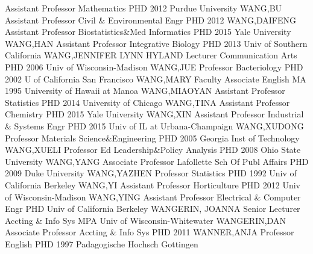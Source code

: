 \documentclass[
]{article}
\begin{document}
\textbar Assistant Professor \textbar Mathematics \textbar PHD 2012
Purdue University \textbar{}  \textbar WANG,BU
\textbar Assistant Professor \textbar Civil \& Environmental Engr
\textbar PHD 2012 \textbar{}  \textbar WANG,DAIFENG
\textbar Assistant Professor \textbar Biostatistics\&Med Informatics
\textbar PHD 2015 Yale University \textbar{} 
\textbar WANG,HAN \textbar Assistant Professor \textbar Integrative
Biology \textbar PHD 2013 Univ of Southern California \textbar{}
 \textbar WANG,JENNIFER LYNN HYLAND \textbar Lecturer
\textbar Communication Arts \textbar PHD 2006 Univ of Wisconsin-Madison
\textbar{}  \textbar WANG,JUE \textbar Professor
\textbar Bacteriology \textbar PHD 2002 U of California San Francisco
\textbar{}  \textbar WANG,MARY \textbar Faculty Associate
\textbar English \textbar MA 1995 University of Hawaii at Manoa
\textbar{}  \textbar WANG,MIAOYAN \textbar Assistant
Professor \textbar Statistics \textbar PHD 2014 University of Chicago
\textbar{}  \textbar WANG,TINA \textbar Assistant Professor
\textbar Chemistry \textbar PHD 2015 Yale University \textbar{}
 \textbar WANG,XIN \textbar Assistant Professor
\textbar Industrial \& Systems Engr \textbar PHD 2015 Univ of IL at
Urbana-Champaign \textbar{}  \textbar WANG,XUDONG
\textbar Professor \textbar Materials Science\&Engineering \textbar PHD
2005 Georgia Inst of Technology \textbar{} 
\textbar WANG,XUELI \textbar Professor \textbar Ed Leadership\&Policy
Analysis \textbar PHD 2008 Ohio State University \textbar{} 
\textbar WANG,YANG \textbar Associate Professor \textbar Lafollette Sch
Of Publ Affairs \textbar PHD 2009 Duke University \textbar{}
 \textbar WANG,YAZHEN \textbar Professor \textbar Statistics
\textbar PHD 1992 Univ of California Berkeley \textbar{} 
\textbar WANG,YI \textbar Assistant Professor \textbar Horticulture
\textbar PHD 2012 Univ of Wisconsin-Madison \textbar{} 
\textbar WANG,YING \textbar Assistant Professor \textbar Electrical \&
Computer Engr \textbar PHD Univ of California Berkeley \textbar{}
 \textbar WANGERIN, JOANNA \textbar Senior Lecturer
\textbar Accting \& Info Sys \textbar MPA Univ of Wisconsin-Whitewater
\textbar{}  \textbar WANGERIN,DAN \textbar Associate
Professor \textbar Accting \& Info Sys \textbar PHD 2011 \textbar{}
 \textbar WANNER,ANJA \textbar Professor \textbar English
\textbar PHD 1997 Padagogische Hochsch Gottingen \textbar{} 
\end{document}

